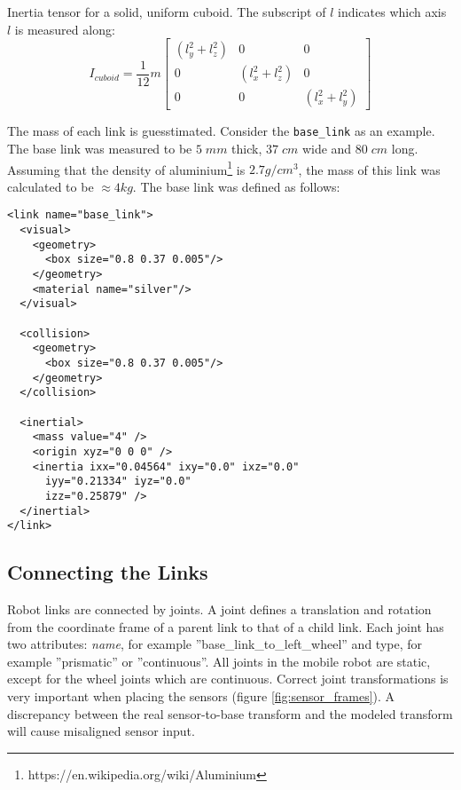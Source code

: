 Inertia tensor for a solid, uniform cuboid. The subscript of $l$ indicates which axis $l$ is measured along:
\begin{equation}
I_{cuboid} = \frac{1}{12}m \begin{bmatrix}
	(l_y^2 + l_z^2) & 0 & 0 \\[0.3em]
	0 & (l_x^2 + l_z^2) & 0 \\[0.3em]
	0 & 0 & (l_x^2 + l_y^2)
\end{bmatrix}
\label{eq:cuboid}
\end{equation}

The mass of each link is guesstimated. Consider the \texttt{base\_link} as an example. The base link was measured to be $5 \; mm$ thick, $37 \; cm$ wide and $80 \; cm$ long. Assuming that the density of aluminium\footnote{https://en.wikipedia.org/wiki/Aluminium} is $2.7 g/cm^3$, the mass of this link was calculated to be $\approx 4 kg$. The base link was defined as follows:

\lstset{language=XML}
\begin{lstlisting}
<link name="base_link">
  <visual>
    <geometry>
      <box size="0.8 0.37 0.005"/>
    </geometry>
    <material name="silver"/>
  </visual>
	  
  <collision>
    <geometry>
      <box size="0.8 0.37 0.005"/>
    </geometry>
  </collision>
	  
  <inertial>
    <mass value="4" />
    <origin xyz="0 0 0" />
    <inertia ixx="0.04564" ixy="0.0" ixz="0.0"
      iyy="0.21334" iyz="0.0" 
      izz="0.25879" />
  </inertial>
</link>
\end{lstlisting}

\subsection{Connecting the Links}

Robot links are connected by joints. A joint defines a translation and rotation from the coordinate frame of a parent link to that of a child link. Each joint has two attributes: \textit{name}, for example ''base\_link\_to\_left\_wheel'' and type, for example ''prismatic'' or ''continuous''. All joints in the mobile robot are static, except for the wheel joints which are continuous. Correct joint transformations is very important when placing the sensors (figure \ref{fig:sensor_frames}). A discrepancy between the real sensor-to-base transform and the modeled transform will cause misaligned sensor input.

